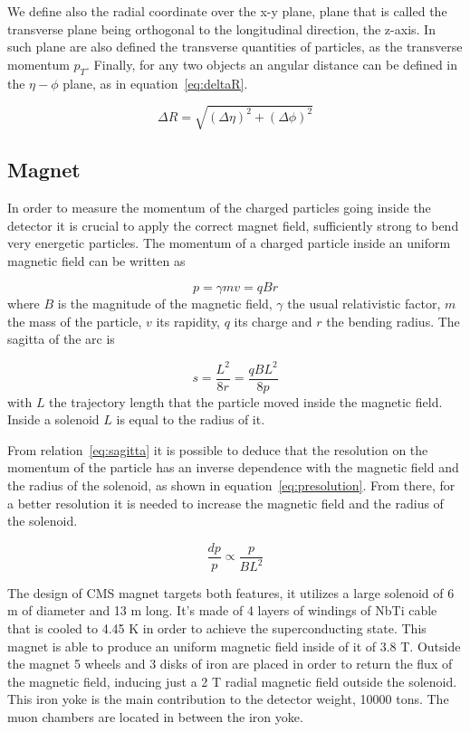 We define also the radial coordinate over the x-y plane, plane that is called the transverse plane being orthogonal to the longitudinal direction, the z-axis. In such plane are also defined the transverse quantities of particles, as the transverse momentum $p_{T}$. Finally, for any two objects an angular distance can be defined in the $\eta-\phi$ plane, as in equation~\ref{eq:deltaR}.

\begin{equation}
  \label{eq:deltaR}
  \Delta R=\sqrt{(\Delta\eta)^{2}+(\Delta\phi)^{2}}
\end{equation}

\subsection{Magnet}
\label{sec:magnet}

In order to measure the momentum of the charged particles going inside the detector it is crucial to apply the correct magnet field, sufficiently strong to bend very energetic particles. The momentum of a charged particle inside an uniform magnetic field can be written as

\begin{equation}
  \label{eq:momB}
  p=\gamma m v=qBr
\end{equation} where $B$ is the magnitude of the magnetic field, $\gamma$ the usual relativistic factor, $m$ the mass of the particle, $v$ its rapidity, $q$ its charge and $r$ the bending radius. The sagitta of the arc is

\begin{equation}
  \label{eq:sagitta}
  s=\frac{L^{2}}{8r}=\frac{qBL^{2}}{8p}
\end{equation} with $L$ the trajectory length that the particle moved inside the magnetic field. Inside a solenoid $L$ is equal to the radius of it. 

From relation~\ref{eq:sagitta} it is possible to deduce that the resolution on the momentum of the particle has an inverse dependence with the magnetic field and the radius of the solenoid, as shown in equation~\ref{eq:presolution}. From there, for a better resolution it is needed to increase the magnetic field and the radius of the solenoid. 

\begin{equation}
  \label{eq:presolution}
  \frac{dp}{p}\propto \frac{p}{BL^{2}}
\end{equation}

The design of CMS magnet targets both features, it utilizes a large solenoid of 6 m of diameter and 13 m long. It's made of 4 layers of windings of NbTi cable that is cooled to 4.45 K in order to achieve the superconducting state. This magnet is able to produce an uniform magnetic field inside of it of 3.8 T. Outside the magnet 5 wheels and 3 disks of iron are placed in order to return the flux of the magnetic field, inducing just a 2 T radial magnetic field outside the solenoid. This iron yoke is the main contribution to the detector weight, 10000 tons. The muon chambers are located in between the iron yoke.

